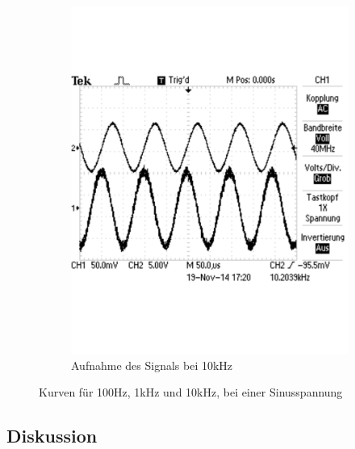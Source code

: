 \documentclass[12pt,a4paper]{article}
\begin{document}
\begin{figure}[H]
\begin{subfigure}[b]{0.28\textwidth}
                \includegraphics[width=\textwidth , scale = 0.4]{2_6_sin_10k.pdf}
                \caption[Aufnahme des Signals bei 10kHz]{Aufnahme des Signals bei 10kHz}
  				\label{fig:2_6_sin_10k}
        \end{subfigure}
        \caption{Kurven für 100Hz, 1kHz und 10kHz, bei einer Sinusspannung}
        \label{fig:2_6_sin}
\end{figure}

\subsection{Diskussion}
\end{document}
